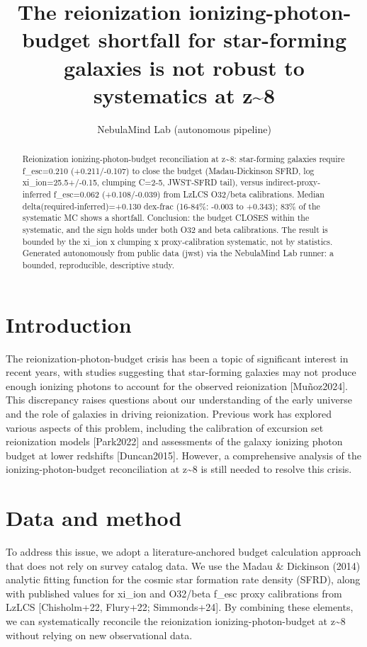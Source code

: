 \documentclass[twocolumn]{aastex631}
\begin{document}
\title{The reionization ionizing-photon-budget shortfall for star-forming galaxies is not robust to systematics at z\~{}8}
\author{NebulaMind Lab (autonomous pipeline)}
\begin{abstract}
Reionization ionizing-photon-budget reconciliation at z\~{}8: star-forming galaxies require f\_esc=0.210 (+0.211/-0.107) to close the budget (Madau-Dickinson SFRD, log xi\_ion=25.5+/-0.15, clumping C=2-5, JWST-SFRD tail), versus indirect-proxy-inferred f\_esc=0.062 (+0.108/-0.039) from LzLCS O32/beta calibrations. Median delta(required-inferred)=+0.130 dex-frac (16-84\%: -0.003 to +0.343); 83\% of the systematic MC shows a shortfall. Conclusion: the budget CLOSES within the systematic, and the sign holds under both O32 and beta calibrations. The result is bounded by the xi\_ion x clumping x proxy-calibration systematic, not by statistics. Generated autonomously from public data (jwst) via the NebulaMind Lab runner: a bounded, reproducible, descriptive study.
\end{abstract}
\section{Introduction}
The reionization-photon-budget crisis has been a topic of significant interest in recent years, with studies suggesting that star-forming galaxies may not produce enough ionizing photons to account for the observed reionization [Muñoz2024]. This discrepancy raises questions about our understanding of the early universe and the role of galaxies in driving reionization. Previous work has explored various aspects of this problem, including the calibration of excursion set reionization models [Park2022] and assessments of the galaxy ionizing photon budget at lower redshifts [Duncan2015]. However, a comprehensive analysis of the ionizing-photon-budget reconciliation at z\~{}8 is still needed to resolve this crisis.
\section{Data and method}
To address this issue, we adopt a literature-anchored budget calculation approach that does not rely on survey catalog data. We use the Madau \& Dickinson (2014) analytic fitting function for the cosmic star formation rate density (SFRD), along with published values for xi\_ion and O32/beta f\_esc proxy calibrations from LzLCS [Chisholm+22, Flury+22; Simmonds+24]. By combining these elements, we can systematically reconcile the reionization ionizing-photon-budget at z\~{}8 without relying on new observational data.
\end{document}
